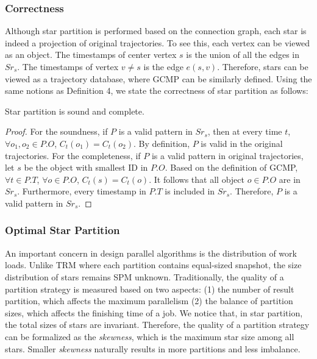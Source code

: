 \subsubsection{Correctness}
Although star partition is performed based on the connection graph, 
each star is indeed a projection of original trajectories.
To see this, each vertex can be viewed as an object. 
The timestamps of center vertex $s$ is the union of all the 
edges in $Sr_s$. The timestamps of vertex $v \neq s$ is the 
edge $e(s,v)$. Therefore, stars can be viewed as a trajectory
database, where GCMP can be similarly defined. Using the same 
notions as Definition 4, we state the correctness
of star partition as follows:

\begin{theorem}
Star partition is sound and complete.
\end{theorem}

\begin{proof}
For the soundness,
if $P$ is a valid pattern in $Sr_s$, then at every time $t$, 
$\forall o_1, o_2 \in P.O$, $C_t(o_1) = C_t(o_2)$.
By definition, $P$ is valid in the original trajectories.
For the completeness,
if $P$ is a valid pattern in original trajectories, 
let $s$ be the object with smallest ID in $P.O$. 
Based on the definition of GCMP, $\forall t \in P.T$, $\forall o \in P.O$, $C_t(s) = C_t(o)$.
It follows that all object $o \in P.O$ are in $Sr_s$. 
Furthermore, every timestamp in $P.T$ is included
in $Sr_s$. Therefore, $P$ is a valid pattern in $Sr_s$.
\end{proof}


\subsubsection{Optimal Star Partition}
An important concern in design parallel algorithms is 
the distribution of work loads. Unlike TRM where each partition
contains equal-sized snapshot, the size distribution 
of stars remains SPM unknown. 
Traditionally, the quality of a partition strategy 
is measured based on two aspects: (1) the number of result partition, which
affects the maximum parallelism
(2) the balance of partition sizes, which affects the finishing
time of a job. We notice that, in star partition, the total sizes of 
stars are invariant. Therefore, the quality of a partition strategy
can be formalized as the \emph{skewness}, which is the maximum star size
among all stars. Smaller \emph{skewness} naturally results in more partitions
and less imbalance.


